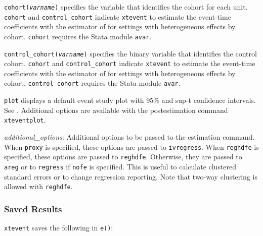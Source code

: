 \documentclass[bib]{./sty/statapress}
\begin{document}
\hangpara
{\tt cohort({\it varname})} specifies the variable that identifies the cohort for each unit.
{\tt cohort} and {\tt control\_cohort} indicate {\tt xtevent} to estimate the event-time coefficients with the estimator of \citet{sun2021estimating} for settings with heterogeneous effects by cohort.
{\tt cohort} requires the Stata module {\tt avar}.

\hangpara
{\tt control\_cohort({\it varname})} specifies the binary variable that identifies the control cohort. {\tt cohort} and {\tt control\_cohort} indicate {\tt xtevent} to estimate the event-time coefficients with the estimator of \citet{sun2021estimating} for settings with heterogeneous effects by cohort.
{\tt control\_cohort} requires the Stata module {\tt avar}.

\hangpara
{\tt plot} displays a default event study plot with 95\% and sup-t confidence intervals. See \citet{montiel2019simultaneous}.  Additional options are available with the postestimation command {\tt xteventplot}.

\hangpara
{\it additional\_options}: Additional options to be passed to the estimation command.
When {\tt proxy} is specified, these options are passed to {\tt ivregress}.
When {\tt reghdfe} is specified, these options are passed to {\tt reghdfe}.
Otherwise, they are passed to {\tt areg} or to {\tt regress} if {\tt nofe} is specified.
This is useful to calculate clustered standard errors or to change regression reporting.
Note that two-way clustering is allowed with {\tt reghdfe}.

\subsubsection{Saved Results}
{\tt xtevent} saves the following in {\tt e()}:
\end{document}
